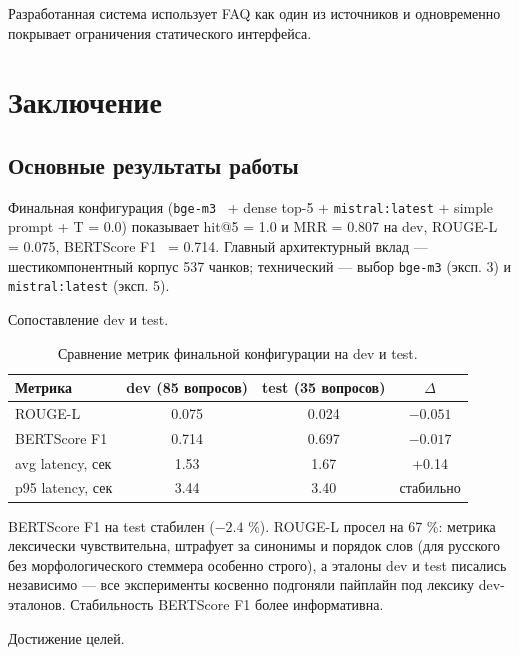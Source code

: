 \documentclass[a4paper,12pt]{extarticle}
\begin{document}
Разработанная система использует FAQ как один из источников и одновременно покрывает ограничения статического интерфейса.

\section{Заключение}

\subsection{Основные результаты работы}
Финальная конфигурация (\texttt{bge-m3}~\cite{bgem3} + dense top-5 + \texttt{mistral:latest} + simple prompt + T = 0.0) показывает hit@5 = 1.0 и MRR = 0.807 на dev, ROUGE-L~\cite{rouge} = 0.075, BERTScore F1~\cite{bertscore} = 0.714. Главный архитектурный вклад --- шестикомпонентный корпус 537 чанков; технический --- выбор \texttt{bge-m3} (эксп. 3) и \texttt{mistral:latest} (эксп. 5).

Сопоставление dev и test.

\begin{table}[ht]
\caption{Сравнение метрик финальной конфигурации на dev и test.}
\label{tab:dev_test}
\centering
\begin{tabular}{lccc}
\toprule
Метрика & dev (85 вопросов) & test (35 вопросов) & $\Delta$ \\
\midrule
ROUGE-L & 0.075 & 0.024 & $-0.051$ \\
BERTScore F1 & 0.714 & 0.697 & $-0.017$ \\
avg latency, сек & 1.53 & 1.67 & +0.14 \\
p95 latency, сек & 3.44 & 3.40 & стабильно \\
\bottomrule
\end{tabular}
\end{table}

BERTScore F1 на test стабилен ($-2.4$ \%). ROUGE-L просел на 67 \%: метрика лексически чувствительна, штрафует за синонимы и порядок слов (для русского без морфологического стеммера особенно строго), а эталоны dev и test писались независимо --- все эксперименты косвенно подгоняли пайплайн под лексику dev-эталонов. Стабильность BERTScore F1 более информативна.

Достижение целей.
\end{document}
